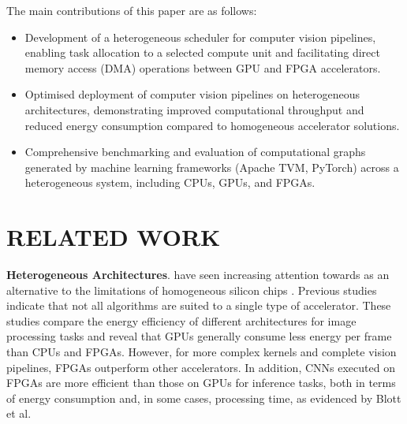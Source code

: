 \documentclass[]{spie}  %
\begin{document}
The main contributions of this paper are as follows:
\begin{itemize}
\item Development of a heterogeneous scheduler for computer vision pipelines, enabling task allocation to a selected compute unit and facilitating direct memory access (DMA) operations between GPU and FPGA accelerators.
\item Optimised deployment of computer vision pipelines on heterogeneous architectures, demonstrating improved computational throughput and reduced energy consumption compared to homogeneous accelerator solutions.
\item Comprehensive benchmarking and evaluation of computational graphs generated by machine learning frameworks (Apache TVM, PyTorch) across a heterogeneous system, including CPUs, GPUs, and FPGAs.
\end{itemize}



\section{RELATED WORK}
\label{sec:background}



\textbf{Heterogeneous Architectures}. have seen increasing attention towards as an alternative to the limitations of homogeneous silicon chips \cite{RooLav17, KobRyoFuj20, XieLinKai17, ChoLeeLee22, Hosseinabady2019HeterogeneousFE}. Previous studies \cite{QasDenKri29} indicate that not all algorithms are suited to a single type of accelerator. These studies compare the energy efficiency of different architectures for image processing tasks and reveal that GPUs generally consume less energy per frame than CPUs and FPGAs. However, for more complex kernels and complete vision pipelines, FPGAs outperform other accelerators. In addition, CNNs executed on FPGAs are more efficient than those on GPUs for inference tasks, both in terms of energy consumption and, in some cases, processing time, as evidenced by Blott et al\cite{BloHalLis}.
\end{document}
